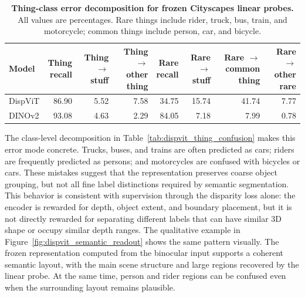 \begin{table}[!t]
    \centering
    \caption{\textbf{Thing-class error decomposition for frozen Cityscapes linear probes.}
    All values are percentages.
    Rare things include rider, truck, bus, train, and motorcycle; common things include person, car, and bicycle.}
    \label{tab:thing_error_aggregate}
    \scriptsize
    \setlength{\tabcolsep}{3pt}
    \renewcommand{\arraystretch}{1.08}
    \begin{tabular*}{\textwidth}{@{\extracolsep{\fill}}lrrrrrrr@{}}
        \toprule
        \textbf{Model} &
        \makecell{\textbf{Thing}\\\textbf{recall}} &
        \makecell{\textbf{Thing}\\$\rightarrow$ \textbf{stuff}} &
        \makecell{\textbf{Thing}\\$\rightarrow$ \textbf{other thing}} &
        \makecell{\textbf{Rare}\\\textbf{recall}} &
        \makecell{\textbf{Rare}\\$\rightarrow$ \textbf{stuff}} &
        \makecell{\textbf{Rare}\\$\rightarrow$ \textbf{common thing}} &
        \makecell{\textbf{Rare}\\$\rightarrow$ \textbf{other rare}} \\
        \midrule
        DispViT & 86.90 & 5.52 & 7.58 & 34.75 & 15.74 & 41.74 & 7.77 \\
        DINOv2 & 93.08 & 4.63 & 2.29 & 84.05 & 7.18 & 7.99 & 0.78 \\
        \bottomrule
    \end{tabular*}
\end{table}

The class-level decomposition in Table~\ref{tab:dispvit_thing_confusion} makes this error mode concrete.
Trucks, buses, and trains are often predicted as cars; riders are frequently predicted as persons; and motorcycles are confused with bicycles or cars.
These mistakes suggest that the representation preserves coarse object grouping, but not all fine label distinctions required by semantic segmentation.
This behavior is consistent with supervision through the disparity loss alone: the encoder is rewarded for depth, object extent, and boundary placement, but it is not directly rewarded for separating different labels that can have similar 3D shape or occupy similar depth ranges.
The qualitative example in Figure~\ref{fig:dispvit_semantic_readout} shows the same pattern visually.
The frozen representation computed from the binocular input supports a coherent semantic layout, with the main scene structure and large regions recovered by the linear probe.
At the same time, person and rider regions can be confused even when the surrounding layout remains plausible.


